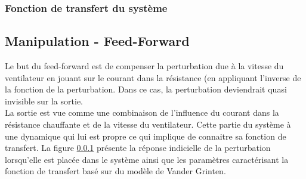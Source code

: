 

\subsubsection{Fonction de transfert du système}


\subsection{Manipulation - Feed-Forward}
\label{FW}
Le but du feed-forward est de compenser la perturbation due à la vitesse du ventilateur en jouant sur le courant dans la résistance (en appliquant l'inverse de la fonction de la perturbation. Dans ce cas, la perturbation deviendrait quasi invisible sur la sortie.\\

La sortie est vue comme une combinaison de l'influence du courant dans la résistance chauffante et de la vitesse du ventilateur. Cette partie du système à une dynamique qui lui est propre ce qui implique de connaitre sa fonction de transfert. La figure \ref{} présente la réponse indicielle de la perturbation lorsqu'elle est placée dans le système ainsi que les paramètres caractérisant la fonction de transfert basé sur du modèle de Vander Grinten.\\

